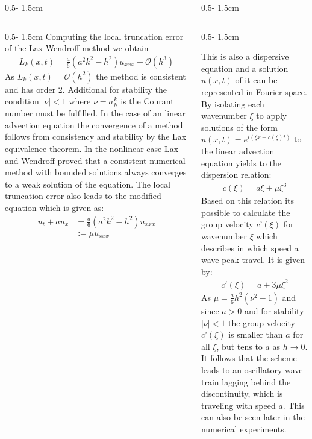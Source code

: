 \documentclass{uibposter}
\begin{document}
\begin{frame}[fragile]
\begin{columns}
\begin{column}{0.5\textwidth - 1.5cm}
\begin{column}{0.5\textwidth - 1.5cm}
\vspace{0.5cm}
Computing the local truncation error of the Lax-Wendroff method we obtain
\begin{align*}
L_k(x, t) = \frac{a}{6}(a^2 k^2 - h^2)u_{xxx} + \mathcal{O}(h^3)
\end{align*}
As $L_k(x,t) = \mathcal{O}(h^2)$ the method is consistent and has order 2. Additional for stability the condition $|\nu| < 1$ where $\nu = a\frac{k}{h}$ is the Courant number must be fulfilled. 
In the case of an linear advection equation the convergence of a method follows from consistency and stability by the Lax equivalence theorem. In the nonlinear case Lax and Wendroff proved that a consistent numerical method with bounded solutions always converges to a weak solution of the equation.
The local truncation error also leads to the modified equation which is given as:
\begin{align*}
u_t + a u_x &= \frac{a}{6} (a^2 k^2 - h^2) u_{xxx}\\
&:= \mu u_{xxx}
\end{align*}

    \end{column}
\end{column}
\begin{column}{0.5\textwidth - 1.5cm}
\begin{column}{0.5\textwidth - 1.5cm}
\vspace*{-1.7cm}


This is also a dispersive equation and a solution $u(x, t)$ of it can be represented in Fourier space. By isolating each wavenumber $\xi$ to apply solutions of the form $u(x,t) = e^{i(\xi x - c(\xi)t)}$ to the linear advection equation yields to the dispersion relation:
\begin{align*}
c(\xi) = a\xi + \mu \xi^3
\end{align*}
Based on this relation its possible to calculate the group velocity $c’(\xi)$ for wavenumber $\xi$ which describes in which speed a wave peak travel. It is given by:
\begin{align*}
c'(\xi) = a + 3\mu \xi^2
\end{align*}
As $\mu = \frac{a}{6}h^2(\nu^2 - 1)$ and since $a > 0$ and for stability $|\nu| < 1$ the group velocity $c’(\xi)$ is smaller than $a$ for all $\xi$, but tens to $a$ as $h\rightarrow0$. It follows that the scheme leads to an oscillatory wave train lagging behind the discontinuity, which is traveling with speed $a$. This can also be seen later in the numerical experiments.
    

\end{column}
\end{column}
\end{columns}
\end{frame}
\end{document}
